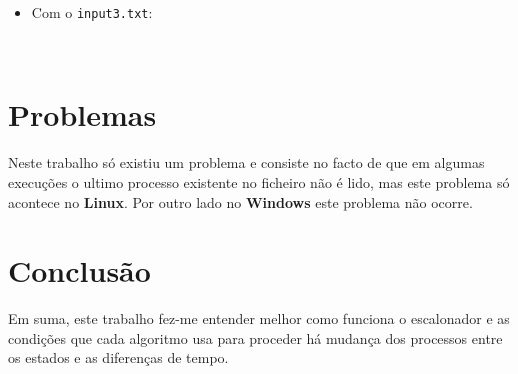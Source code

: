 \documentclass[11pt]{article}   %
\begin{document}
\begin{itemize}
\begin{itemize}
\begin{verbatim}
        \end{verbatim}
        \item Com o \verb|input3.txt|:
        \begin{verbatim}
            
        \end{verbatim}
    \end{itemize}
\end{itemize}

\section{Problemas}
\hspace{0,5cm}Neste trabalho só existiu um problema e consiste no facto de que em algumas execuções o ultimo processo existente no ficheiro não é lido, mas este problema só acontece no \textbf{Linux}. Por outro lado no \textbf{Windows} este problema não ocorre.
\section{Conclusão} %
Em suma, este trabalho fez-me entender melhor como funciona o escalonador e as condições que cada algoritmo usa para proceder há mudança dos processos entre os estados e as diferenças de tempo. 
\end{document}
